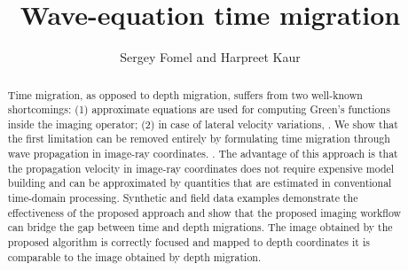 \title{Wave-equation time migration}
\author{Sergey Fomel and Harpreet Kaur}

\address{Bureau of Economic Geology, \\
John A. and Katherine G. Jackson School of Geosciences \\
The University of Texas at Austin \\
University Station, Box X \\
Austin, TX 78713-8924 \\
sergey.fomel@beg.utexas.edu}


\maketitle

\begin{abstract}
  Time migration, as opposed to depth migration,
  suffers from two well-known shortcomings: (1) approximate equations
  are used for computing Green's functions inside the imaging
  operator; (2) in case of lateral velocity variations, . We show that the first
  limitation can be removed entirely by formulating time migration
  through wave propagation in image-ray coordinates. . The advantage of
  this approach is that the propagation velocity in image-ray
  coordinates does not require expensive model building and can be
  approximated by quantities that are estimated in conventional
  time-domain processing. Synthetic and field data examples demonstrate the effectiveness of the proposed approach and show that the proposed imaging workflow 
  can bridge the gap between time and depth migrations. The image obtained by the proposed algorithm is
correctly focused and mapped to depth coordinates it is comparable to the image obtained by depth migration. 
\end{abstract}

